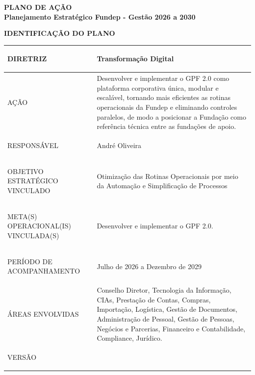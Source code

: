 \documentclass[12pt,a4paper]{article}
\newcommand{\PlanoVersao}{0.3}
\newcommand{\secao}[1]{%
  \par\vspace{\dimexpr16pt-\parskip\relax}%
  {\noindent\bfseries\color{azulTitulo}\fontsize{13}{16}\selectfont #1}%
  \par\vspace{\dimexpr8pt-\parskip\relax}%
}
\newlength{\utilTab}
\newlength{\colIdRot}\newlength{\colIdVal}
\begin{document}
\thispagestyle{empty}


\begin{center}
  \singlespacing
  {\bfseries\color{azulTitulo}\fontsize{17}{20}\selectfont PLANO DE AÇÃO}\\[6pt]
  {\bfseries\color{azulTitulo}\fontsize{13}{16}\selectfont Planejamento Estratégico Fundep - Gestão 2026 a 2030}
\end{center}

\secao{IDENTIFICAÇÃO DO PLANO}

\begingroup
\footnotesize\singlespacing
{}
\setlength{\arrayrulewidth}{1pt}
\setlength{\tabcolsep}{5.4pt}
\renewcommand{\arraystretch}{1.45}
\setlength{\utilTab}{\dimexpr\textwidth-4\tabcolsep-3\arrayrulewidth\relax}
\setlength{\colIdRot}{0.2819\utilTab}
\setlength{\colIdVal}{\dimexpr\utilTab-\colIdRot\relax}
\begin{tabular}{|>{\cellcolor{azulClaro}\bfseries\raggedright\arraybackslash}p{\colIdRot}|>{\raggedright\arraybackslash}p{\colIdVal}|}
\hline
DIRETRIZ & Transformação Digital \\
\hline
AÇÃO & Desenvolver e implementar o GPF 2.0 como plataforma corporativa única, modular e escalável, tornando mais eficientes as rotinas operacionais da Fundep e eliminando controles paralelos, de modo a posicionar a Fundação como referência técnica entre as fundações de apoio. \\
\hline
RESPONSÁVEL & André Oliveira \\
\hline
OBJETIVO ESTRATÉGICO VINCULADO & Otimização das Rotinas Operacionais por meio da Automação e Simplificação de Processos \\
\hline
META(S) OPERACIONAL(IS) VINCULADA(S) & Desenvolver e implementar o GPF 2.0. \\
\hline
PERÍODO DE ACOMPANHAMENTO & Julho de 2026 a Dezembro de 2029 \\
\hline
ÁREAS ENVOLVIDAS & Conselho Diretor, Tecnologia da Informação, CIAs, Prestação de Contas, Compras, Importação, Logística, Gestão de Documentos, Administração de Pessoal, Gestão de Pessoas, Negócios e Parcerias, Financeiro e Contabilidade, Compliance, Jurídico. \\
\hline
VERSÃO & \PlanoVersao \\
\hline
\end{tabular}
\endgroup
\end{document}
